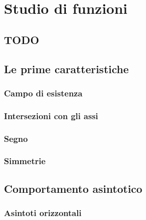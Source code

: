 
\chapter{Studio di funzioni}

\section{TODO}

\section{Le prime caratteristiche}
\label{sec:01_primecaratteristiche}


% 

\subsection{Campo di esistenza}

\subsection{Intersezioni con gli assi}

\subsection{Segno}

\subsection{Simmetrie}


\section{Comportamento asintotico}
\label{sec:02_comportamentoasintotico}

\subsection{Asintoti orizzontali}

